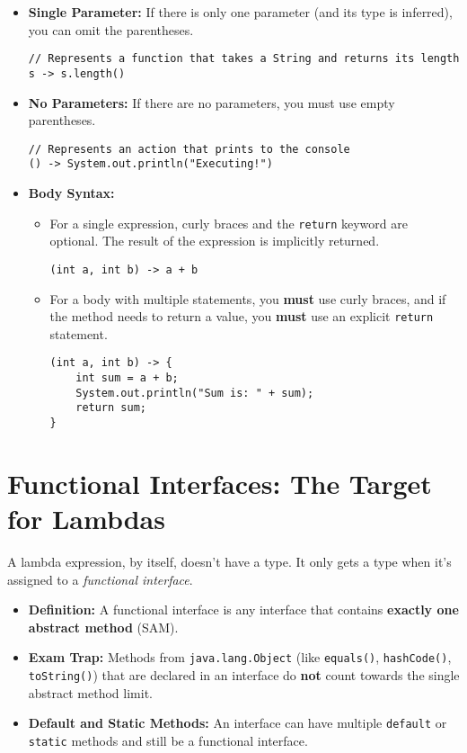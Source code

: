 \documentclass[12pt]{article}
\begin{document}
\begin{enumerate}[label=(\arabic*)]
\begin{itemize}
    \item \textbf{Single Parameter:} If there is only one parameter (and its type is inferred), you can omit the parentheses.
    \begin{verbatim}
// Represents a function that takes a String and returns its length
s -> s.length()
    \end{verbatim}

    \item \textbf{No Parameters:} If there are no parameters, you must use empty parentheses.
    \begin{verbatim}
// Represents an action that prints to the console
() -> System.out.println("Executing!")
    \end{verbatim}

    \item \textbf{Body Syntax:} 
    \begin{itemize}
        \item For a single expression, curly braces and the \texttt{return} keyword are optional. The result of the expression is implicitly returned.
        \begin{verbatim}
(int a, int b) -> a + b
        \end{verbatim}
        \item For a body with multiple statements, you \textbf{must} use curly braces, and if the method needs to return a value, you \textbf{must} use an explicit \texttt{return} statement.
        \begin{verbatim}
(int a, int b) -> {
    int sum = a + b;
    System.out.println("Sum is: " + sum);
    return sum;
}
        \end{verbatim}
    \end{itemize}
\end{itemize}

\section{Functional Interfaces: The Target for Lambdas}
A lambda expression, by itself, doesn't have a type. It only gets a type when it's assigned to a \textit{functional interface}. 

\begin{itemize}
    \item \textbf{Definition:} A functional interface is any interface that contains \textbf{exactly one abstract method} (SAM).
    \item \textbf{Exam Trap:} Methods from \texttt{java.lang.Object} (like \texttt{equals()}, \texttt{hashCode()}, \texttt{toString()}) that are declared in an interface do \textbf{not} count towards the single abstract method limit.
    \item \textbf{Default and Static Methods:} An interface can have multiple \texttt{default} or \texttt{static} methods and still be a functional interface.
\end{itemize}


\end{enumerate}
\end{document}

